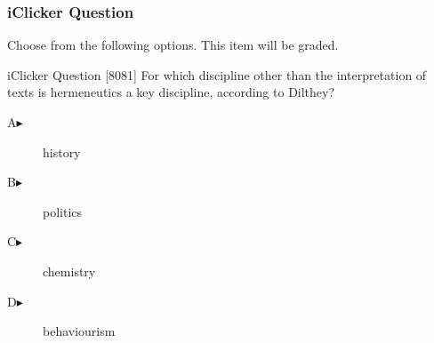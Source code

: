 \begin{frame}
  \frametitle{iClicker Question}
Choose from the following options. This item will be graded.
\begin{block}{iClicker Question}
[8081] For which discipline other than the interpretation of texts is
hermeneutics a key discipline, according to Dilthey?
\end{block}
\begin{description}
\item[A\hspace{.2in}$\blacktriangleright$] history
\item[B\hspace{.2in}$\blacktriangleright$] politics
\item[C\hspace{.2in}$\blacktriangleright$] chemistry
\item[D\hspace{.2in}$\blacktriangleright$] behaviourism
\end{description}
\end{frame}
